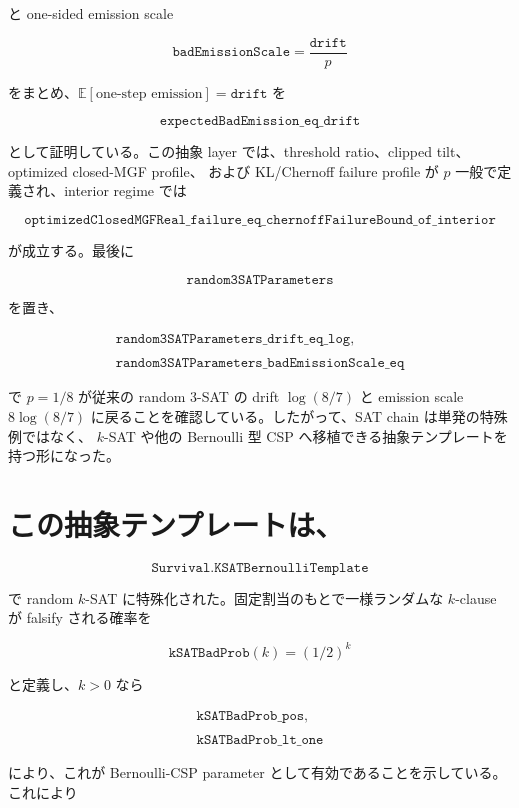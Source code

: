 \documentclass[12pt,a4paper]{article}
\begin{document}
と one-sided emission scale

\[
\texttt{badEmissionScale}=\frac{\texttt{drift}}{p}
\]

をまとめ、\(\mathbb E[\text{one-step emission}]=\texttt{drift}\) を

\[
\texttt{expectedBadEmission\_eq\_drift}
\]

として証明している。この抽象 layer では、threshold ratio、clipped tilt、optimized closed-MGF profile、 および KL/Chernoff failure profile が \(p\) 一般で定義され、interior regime では

\[
\texttt{optimizedClosedMGFReal\_failure\_eq\_chernoffFailureBound\_of\_interior}
\]

が成立する。最後に

\[
\texttt{random3SATParameters}
\]

を置き、

\[
\begin{aligned}
\texttt{random3SATParameters\_drift\_eq\_log}, \\
\qquad \\
\texttt{random3SATParameters\_badEmissionScale\_eq}
\end{aligned}
\]

で \(p=1/8\) が従来の random 3-SAT の drift \(\log(8/7)\) と emission scale \(8\log(8/7)\) に戻ることを確認している。したがって、SAT chain は単発の特殊例ではなく、 \(k\)-SAT や他の Bernoulli 型 CSP へ移植できる抽象テンプレートを持つ形になった。

\section{この抽象テンプレートは、}\label{ux3053ux306eux62bdux8c61ux30c6ux30f3ux30d7ux30ecux30fcux30c8ux306f}

\[
\texttt{Survival.KSATBernoulliTemplate}
\]

で random \(k\)-SAT に特殊化された。固定割当のもとで一様ランダムな \(k\)-clause が falsify される確率を

\[
\texttt{kSATBadProb}(k)=(1/2)^k
\]

と定義し、\(k>0\) なら

\[
\begin{aligned}
\texttt{kSATBadProb\_pos}, \\
\qquad \\
\texttt{kSATBadProb\_lt\_one}
\end{aligned}
\]

により、これが Bernoulli-CSP parameter として有効であることを示している。これにより
\end{document}
